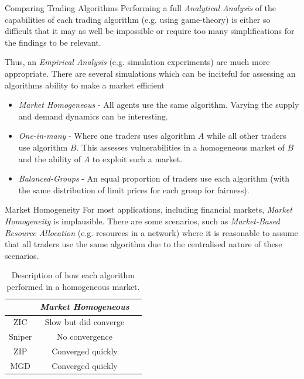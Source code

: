\documentclass[11pt,a4paper]{article}
\begin{document}
  \begin{remark}{Comparing Trading Algorithms}
    Performing a full \textit{Analytical Analysis} of the capabilities of each trading algorithm (e.g. using game-theory) is either so difficult that it may as well be impossible or require too many simplifications for the findings to be relevant.
    \par Thus, an \textit{Empirical Analysis} (e.g. simulation experiments) are much more appropriate. There are several simulations which can be inciteful for assessing an algorithms ability to make a market efficient
    \begin{itemize}
      \item \textit{Market Homogeneous} - All agents use the same algorithm. Varying the supply and demand dynamics can be interesting.
      \item \textit{One-in-many} - Where one traders uses algorithm $A$ while all other traders use algorithm $B$. This assesses vulnerabilities in a homogeneous market of $B$ and the ability of $A$ to exploit such a market.
      \item \textit{Balanced-Groups} - An equal proportion of traders use each algorithm (with the same distribution of limit prices for each group for fairness).
    \end{itemize}
  \end{remark}

  \begin{remark}{Market Homogeneity}
    For most applications, including financial markets, \textit{Market Homogeneity} is implausible. There are some scenarios, such as \textit{Market-Based Resource Allocation} (e.g. resources in a network) where it is reasonable to assume that all traders use the same algorithm due to the centralised nature of these scenarios.
  \end{remark}

  \begin{table}[ht!]
    \centering
    \begin{tabular}{|c|c|c|}
      \hline
      &\textit{Market Homogeneous}\\
      \hline
      ZIC&Slow but did converge\\
      Sniper&No convergence\\
      ZIP&Converged quickly\\
      MGD&Converged quickly\\
      \hline
    \end{tabular}
    \caption{Description of how each algorithm performed in a homogeneous market.}
    \label{tab_HomogeneousMarket}
  \end{table}
\end{document}
